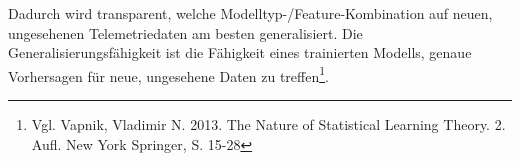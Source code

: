 \noindent
Dadurch wird transparent, welche Modelltyp-/Feature-Kombination auf neuen, ungesehenen Telemetriedaten am besten generalisiert. Die Generalisierungsfähigkeit ist die Fähigkeit eines trainierten Modells, genaue Vorhersagen für neue, ungesehene Daten zu treffen\footnote{Vgl. Vapnik, Vladimir N. 2013. The Nature of Statistical Learning Theory. 2. Aufl. New York Springer, S. 15-28}.
